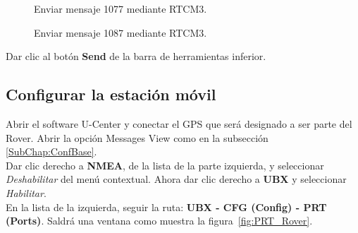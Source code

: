 \begin{figure}[H] %
\caption{Enviar mensaje 1077 mediante RTCM3.}
\label{fig:1077_Base}
\end{figure}

\begin{figure}[H] %
\caption{Enviar mensaje 1087 mediante RTCM3.}
\label{fig:1087_Base}
\end{figure}

Dar clic al botón \textbf{Send} de la barra de herramientas inferior.\\

\subsection{Configurar la estación móvil}\label{SubChap:ConfMov}

Abrir el software U-Center y conectar el GPS que será designado a ser parte del Rover. Abrir la opción Messages View como en la subsección \ref{SubChap:ConfBase}.\\

Dar clic derecho a \textbf{NMEA}, de la lista de la parte izquierda, y seleccionar \textit{Deshabilitar} del menú contextual. Ahora dar clic derecho a \textbf{UBX} y seleccionar \textit{Habilitar}.\\

En la lista de la izquierda, seguir la ruta: \textbf{UBX - CFG (Config) - PRT (Ports)}. Saldrá una ventana como muestra la figura~\ref{fig:PRT_Rover}.

